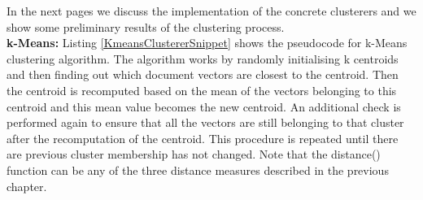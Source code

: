 In the next pages we discuss the implementation of the concrete clusterers and we show some preliminary results of the clustering process.\\

\textbf{k-Means:} Listing \ref{KmeansClustererSnippet} shows the pseudocode for k-Means clustering algorithm. The algorithm works by randomly initialising k centroids and then finding out which document vectors are closest to the centroid. Then the centroid is recomputed based on the mean of the vectors belonging to this centroid and this mean value becomes the new centroid. An additional check is performed again to ensure that all the vectors are still belonging to that cluster after the recomputation of the centroid. This procedure is repeated until there are previous cluster membership has not changed. Note that the distance() function can be any of the three distance measures described in the previous chapter.


